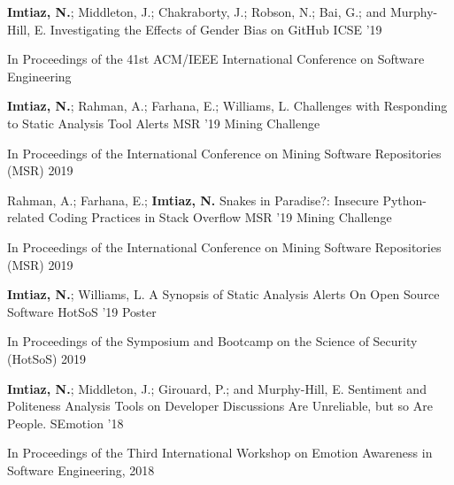 \begin{cventries}
    \cventry
        {\textbf{Imtiaz, N.}; Middleton, J.; Chakraborty, J.; Robson, N.; Bai, G.; and Murphy-Hill, E.}
        {Investigating the Effects of Gender Bias on GitHub}
        {ICSE '19}
        {}
        {
          \begin{cvitems}
         \item {In Proceedings of the 41st ACM/IEEE International Conference on Software Engineering}
          \end{cvitems}
        }
  \cventry
  {\textbf{Imtiaz, N.}; Rahman, A.; Farhana, E.; Williams, L.}
  {Challenges with Responding to Static Analysis Tool Alerts}
  {MSR '19 Mining Challenge}
  {}
  {
        \begin{cvitems}
        \item { In Proceedings of the International Conference on Mining Software Repositories (MSR) 2019}
      \end{cvitems}
  } 
  \cventry
  {Rahman, A.; Farhana, E.; \textbf{Imtiaz, N.}}
  {Snakes in Paradise?: Insecure Python-related Coding Practices in Stack Overflow}
  {MSR '19 Mining Challenge}
  {}
  {
    \begin{cvitems}
        \item { In Proceedings of the International Conference on Mining Software Repositories (MSR) 2019}
      \end{cvitems}
  } 
  \cventry
  {\textbf{Imtiaz, N.}; Williams, L.}
  {A Synopsis of Static Analysis Alerts On Open Source Software}
  {HotSoS '19 Poster}
  {}
  {
    \begin{cvitems}
    \item {In Proceedings of the Symposium and Bootcamp on the Science of Security (HotSoS) 2019} 
    \end{cvitems}
  }
  \cventry
    {\textbf{Imtiaz, N.}; Middleton, J.; Girouard, P.; and Murphy-Hill, E.}
    {Sentiment and Politeness Analysis Tools on Developer Discussions Are Unreliable, but so Are People.}
    {SEmotion '18}
    {}
    {
      \begin{cvitems}
        \item {In Proceedings of the Third International Workshop on Emotion Awareness in Software Engineering, 2018}
      \end{cvitems}
    }
\end{cventries}
